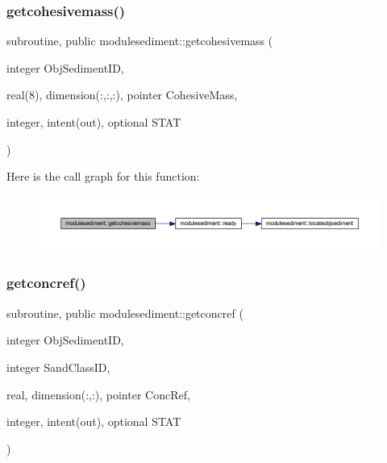 \subsubsection{\texorpdfstring{getcohesivemass()}{getcohesivemass()}}
{\footnotesize\ttfamily subroutine, public modulesediment\+::getcohesivemass (\begin{DoxyParamCaption}\item[{integer}]{Obj\+Sediment\+ID,  }\item[{real(8), dimension(\+:,\+:,\+:), pointer}]{Cohesive\+Mass,  }\item[{integer, intent(out), optional}]{S\+T\+AT }\end{DoxyParamCaption})}

Here is the call graph for this function\+:\nopagebreak
\begin{figure}[H]
\begin{center}
\leavevmode
\includegraphics[width=350pt]{namespacemodulesediment_ae44dda471948f0f9a9a2e1c32fd50738_cgraph}
\end{center}
\end{figure}
\mbox{\label{namespacemodulesediment_a1ace217828c80197497b60fcaad2f95b}} 
\subsubsection{\texorpdfstring{getconcref()}{getconcref()}}
{\footnotesize\ttfamily subroutine, public modulesediment\+::getconcref (\begin{DoxyParamCaption}\item[{integer}]{Obj\+Sediment\+ID,  }\item[{integer}]{Sand\+Class\+ID,  }\item[{real, dimension(\+:,\+:), pointer}]{Conc\+Ref,  }\item[{integer, intent(out), optional}]{S\+T\+AT }\end{DoxyParamCaption})}

